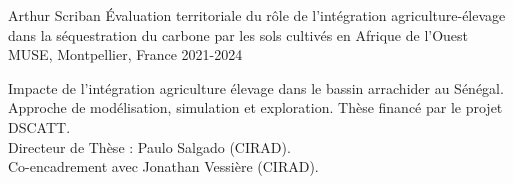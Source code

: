 \begin{cventries}
\cventry
  {Arthur Scriban} %
  {Évaluation territoriale du rôle de l’intégration agriculture-élevage dans la séquestration du carbone par les sols cultivés en Afrique de l’Ouest} %
  {MUSE, Montpellier, France} %
  {2021-2024} %
  {
    \begin{cvitems} %
     Impacte de l'intégration agriculture élevage dans le bassin arrachider au Sénégal. Approche de modélisation, simulation et exploration. Thèse financé par le projet DSCATT.\\
     Directeur de Thèse : Paulo Salgado (CIRAD).\\
     Co-encadrement avec Jonathan Vessière (CIRAD).
    \end{cvitems}
  }
\end{cventries}

